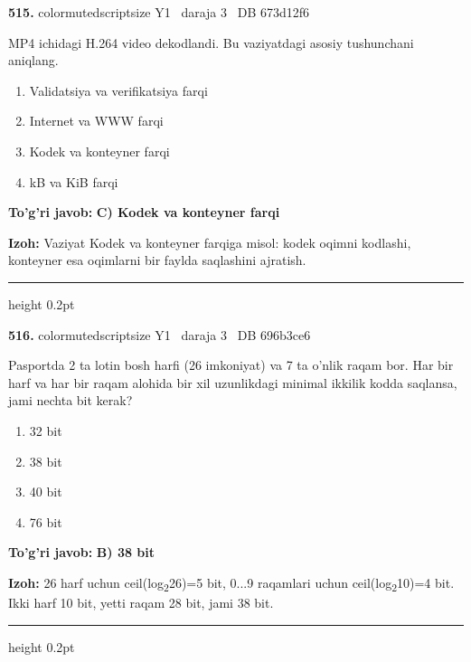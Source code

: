\documentclass[10pt,a4paper,oneside]{article}
\begin{document}
\noindent\textbf{\color{ink}515.}  {color{muted}scriptsize Y1 \textbullet\ daraja 3 \textbullet\ DB 673d12f6}
\par
MP4 ichidagi H.264 video dekodlandi. Bu vaziyatdagi asosiy tushunchani aniqlang.
\begin{enumerate}[label=\Alph*),leftmargin=9mm]
\item Validatsiya va verifikatsiya farqi
\item Internet va WWW farqi
\item Kodek va konteyner farqi
\item kB va KiB farqi
\end{enumerate}
\begin{tcolorbox}[enhanced,breakable,colback=teal!4,colframe=teal!50!black,boxrule=0.5pt,arc=1.1mm,left=3mm,right=3mm,top=1.7mm,bottom=1.7mm,before skip=2mm,after skip=2mm]
\textbf{\color{teal}To'g'ri javob:} \textbf{C) Kodek va konteyner farqi}
\par\smallskip
\textbf{Izoh:} Vaziyat Kodek va konteyner farqiga misol: kodek oqimni kodlashi, konteyner esa oqimlarni bir faylda saqlashini ajratish.
\end{tcolorbox}
\vspace{2mm}\hrule height 0.2pt \vspace{3mm}

\noindent\textbf{\color{ink}516.}  {color{muted}scriptsize Y1 \textbullet\ daraja 3 \textbullet\ DB 696b3ce6}
\par
Pasportda 2 ta lotin bosh harfi (26 imkoniyat) va 7 ta o'nlik raqam bor. Har bir harf va har bir raqam alohida bir xil uzunlikdagi minimal ikkilik kodda saqlansa, jami nechta bit kerak?
\begin{enumerate}[label=\Alph*),leftmargin=9mm]
\item 32 bit
\item 38 bit
\item 40 bit
\item 76 bit
\end{enumerate}
\begin{tcolorbox}[enhanced,breakable,colback=teal!4,colframe=teal!50!black,boxrule=0.5pt,arc=1.1mm,left=3mm,right=3mm,top=1.7mm,bottom=1.7mm,before skip=2mm,after skip=2mm]
\textbf{\color{teal}To'g'ri javob:} \textbf{B) 38 bit}
\par\smallskip
\textbf{Izoh:} 26 harf uchun ceil(log\textsubscript{2}26)=5 bit, 0...9 raqamlari uchun ceil(log\textsubscript{2}10)=4 bit. Ikki harf 10 bit, yetti raqam 28 bit, jami 38 bit.
\end{tcolorbox}
\vspace{2mm}\hrule height 0.2pt \vspace{3mm}
\end{document}
